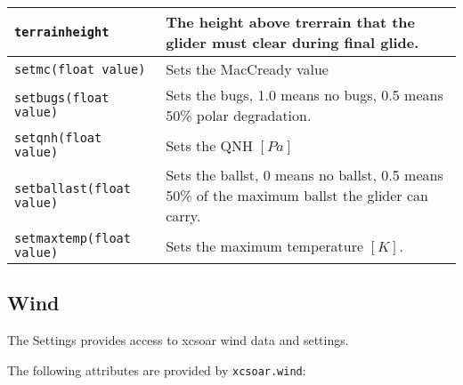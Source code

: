 \begin{maxipage}
\begin{tabularx}{1.9\textwidth}{l|X}
\hline

\verb|terrainheight| & The height above trerrain that the glider must clear during
final glide.\\

\hline

\verb|setmc(float value)| &  Sets the MacCready value\\

\hline

\verb|setbugs(float value)| & Sets the bugs, 1.0 means no bugs, 0.5 means 50\% polar
degradation.\\

\hline

\verb|setqnh(float value)| & Sets the QNH $[{Pa}]$\\

\hline

\verb|setballast(float value)| & Sets the ballst, 0 means no ballst, 0.5 means 50\%
of the maximum \newline ballst the glider can carry.\\

\hline

\verb|setmaxtemp(float value)| & Sets the maximum temperature $[{K}]$.\\

\hline

\end{tabularx}
\end{maxipage}

\subsection{Wind}

The Settings provides access to xcsoar wind data and settings.

The following attributes are provided by \verb|xcsoar.wind|:

